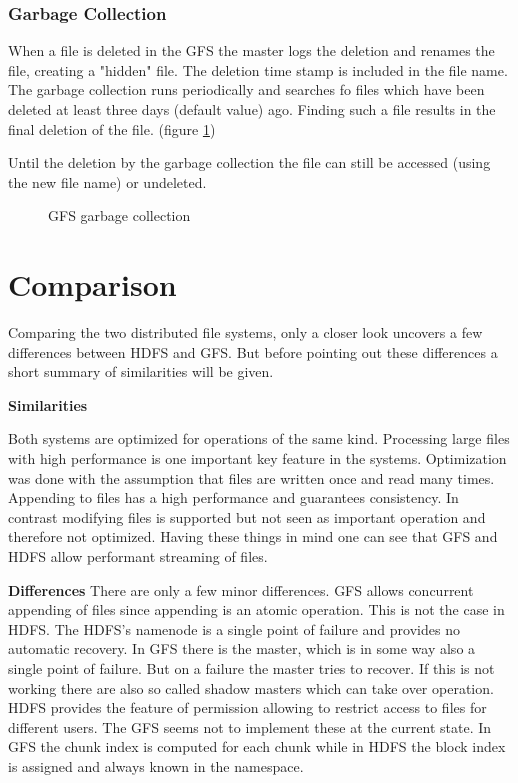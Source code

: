 \documentclass{sig-alternate}
\begin{document}
\subsubsection{Garbage Collection}
\label{gfs_gc}
When a file is deleted in the GFS the master logs the deletion and renames the file, creating a "hidden" file. The deletion time stamp is included in the file name. The garbage collection runs periodically and searches fo files which have been deleted at least three days (default value) ago. Finding such a file results in the final deletion of the file. (figure \ref{fig:gfs_gc})

Until the deletion by the garbage collection the file can still be accessed (using the new file name) or undeleted.

\begin{figure}[!hbt]
\centering
{}
\caption{GFS garbage collection}
\label{fig:gfs_gc}
\end{figure}

\section{Comparison}
Comparing the two distributed file systems, only a closer look uncovers a few differences between HDFS and GFS. But before pointing out these differences a short summary of similarities will be given.\cite{comparison1}

\textbf{Similarities}

Both systems are optimized for operations of the same kind. Processing large files with high performance is one important key feature in the systems. Optimization was done with the assumption that files are written once and read many times. Appending to files has a high performance and guarantees consistency. In contrast modifying files is supported but not seen as important operation and therefore not optimized.
Having these things in mind one can see that GFS and HDFS allow performant streaming of files.

\textbf{Differences}
There are only a few minor differences. GFS allows concurrent appending of files since appending is an atomic operation. This is not the case in HDFS.
The HDFS's namenode is a single point of failure and provides no automatic recovery. In GFS there is the master, which is in some way also a single point of failure. But on a failure the master tries to recover. If this is not working there are also so called shadow masters which can take over operation.
HDFS provides the feature of permission allowing to restrict access to files for different users. The GFS seems not to implement these at the current state.
In GFS the chunk index is computed for each chunk while in HDFS the block index is assigned and always known in the namespace.
\end{document}

